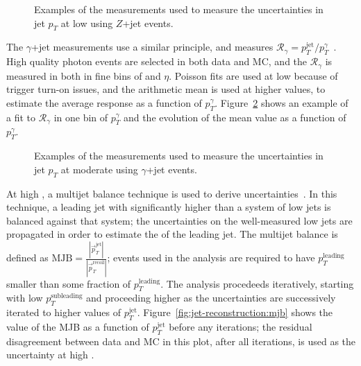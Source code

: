
\begin{figure}
\centering
{}
\label{fig:jet-reconstruction:z_jet}
\caption{Examples of the measurements used to measure the uncertainties in jet $p_T$ at low \pt using $Z$+jet events.}
\end{figure}


The $\gamma$+jet measurements use a similar principle, and measures $\mathcal{R}_\gamma = p_T^\mathrm{jet} / p_T^\gamma$~\cite{JES2011}. High quality photon events are selected in both data and MC, and the $\mathcal{R}_\gamma$ is measured in both in fine bins of \pt and $\eta$. Poisson fits are used at low \pt because of trigger turn-on issues, and the arithmetic mean is used at higher values, to estimate the average response as a function of $p_T^\gamma$.  Figure~\ref{fig:jet-reconstruction:gamma_jet} shows an example of a fit to $\mathcal{R}_\gamma$ in one bin of $p_T^\gamma$ and the evolution of the mean value as a function of $p_T^\gamma$.


\begin{figure}
\centering
{}
\label{fig:jet-reconstruction:gamma_jet}
\caption{Examples of the measurements used to measure the uncertainties in jet $p_T$ at moderate \pt using $\gamma$+jet events.}
\end{figure}


At high \pt, a multijet balance technique is used to derive uncertainties~\cite{ATLAS-CONF-2015-017}. In this technique, a leading jet with \pt significantly higher than a system of low \pt jets is balanced against that system; the uncertainties on the well-measured low \pt jets are propagated in order to estimate the \pt of the leading jet. The multijet balance is defined as $\mathrm{MJB} = \frac{|\vec{p}_T^{\mathrm{jet}}|}{|\vec{p}_T^{\mathrm{recoil}}|} $; events used in the analysis are required to have $p_T^\mathrm{leading}$ smaller than some fraction of $p_T^\mathrm{leading}$. The analysis procedeeds iteratively, starting with low $p_T^\mathrm{subleading}$ and proceeding higher as the uncertainties are successively iterated to higher values of $p_T^\mathrm{jet}$. Figure~\ref{fig:jet-reconstruction:mjb} shows the value of the MJB as a function of $p_T^\mathrm{jet}$ before any iterations; the residual disagreement between data and MC in this plot, after all iterations, is used as the uncertainty at high \pt.

